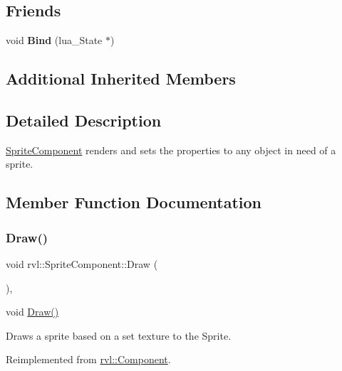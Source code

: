 \subsection*{Friends}
\begin{DoxyCompactItemize}
\item 
\mbox{\label{classrvl_1_1_sprite_component_a2fe21ef42619f691f13abc7d5555490a}} 
void {\bfseries Bind} (lua\+\_\+\+State $\ast$)
\end{DoxyCompactItemize}
\subsection*{Additional Inherited Members}


\subsection{Detailed Description}
\hyperlink{classrvl_1_1_sprite_component}{Sprite\+Component} renders and sets the properties to any object in need of a sprite. 

\subsection{Member Function Documentation}
\mbox{\label{classrvl_1_1_sprite_component_a40bd8ef0e0334620e36f164fcff0b650}} 
\subsubsection{\texorpdfstring{Draw()}{Draw()}}
{\footnotesize\ttfamily void rvl\+::\+Sprite\+Component\+::\+Draw (\begin{DoxyParamCaption}{ }\end{DoxyParamCaption})\hspace{0.3cm}{\ttfamily [override]}, {\ttfamily [virtual]}}



void \hyperlink{classrvl_1_1_sprite_component_a40bd8ef0e0334620e36f164fcff0b650}{Draw()} 

Draws a sprite based on a set texture to the Sprite. 

Reimplemented from \hyperlink{classrvl_1_1_component}{rvl\+::\+Component}.

